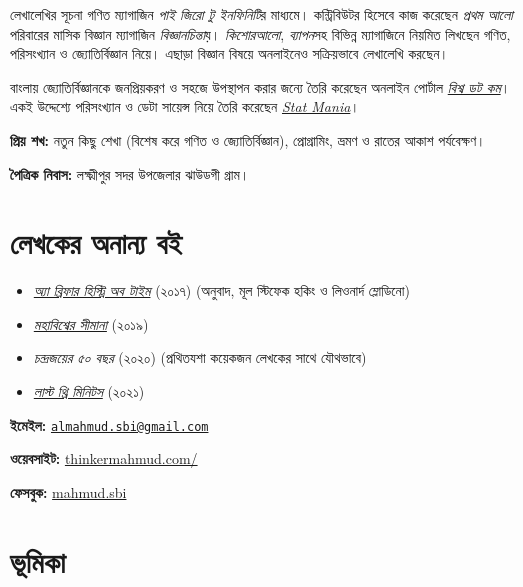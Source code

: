 \documentclass[
]{book}
\providecommand{\tightlist}{%
  \setlength{\itemsep}{0pt}\setlength{\parskip}{0pt}}
\begin{document}
লেখালেখির সূচনা গণিত ম্যাগাজিন \emph{পাই জিরো টু ইনফিনিটি}র মাধ্যমে। কন্ট্রিবিউটর হিসেবে কাজ করেছেন \emph{প্রথম আলো} পরিবারের মাসিক বিজ্ঞান ম্যাগাজিন \emph{বিজ্ঞানচিন্তা}য়। \emph{কিশোরআলো}, \emph{ব্যাপন}সহ বিভিন্ন ম্যাগাজিনে নিয়মিত লিখছেন গণিত, পরিসংখ্যান ও জ্যোতির্বিজ্ঞান নিয়ে। এছাড়া বিজ্ঞান বিষয়ে অনলাইনেও সক্রিয়ভাবে লেখালেখি করছেন।

বাংলায় জ্যোতির্বিজ্ঞানকে জনপ্রিয়করণ ও সহজে উপস্থাপন করার জন্যে তৈরি করেছেন অনলাইন পোর্টাল \href{https://sky.bishwo.com}{\emph{বিশ্ব ডট কম}}। একই উদ্দেশ্যে পরিসংখ্যান ও ডেটা সায়েন্স নিয়ে তৈরি করেছেন \href{https://www.statmania.info}{\emph{Stat Mania}}।

\textbf{প্রিয় শখ:} নতুন কিছু শেখা (বিশেষ করে গণিত ও জ্যোতির্বিজ্ঞান), প্রোগ্রামিং, ভ্রমণ ও রাতের আকাশ পর্যবেক্ষণ।

\textbf{পৈত্রিক নিবাস:} লক্ষ্মীপুর সদর উপজেলার ঝাউডগী গ্রাম।

\hypertarget{ux9b2ux996ux995ux9b0-ux985ux9a8ux9a8ux9af-ux9acux987}{%
\section{লেখকের অনান্য বই}\label{ux9b2ux996ux995ux9b0-ux985ux9a8ux9a8ux9af-ux9acux987}}

\begin{itemize}
\tightlist
\item
  \emph{\href{https://www.rokomari.com/book/author/47631}{অ্যা ব্রিফার হিস্ট্রি অব টাইম}} (২০১৭) (অনুবাদ, মূল স্টিফেক হকিং ও লিওনার্দ ম্লোডিনো)
\item
  \emph{\href{https://www.rokomari.com/book/author/47631}{মহাবিশ্বের সীমানা}} (২০১৯)
\item
  \emph{চন্দ্রজয়ের ৫০ বছর} (২০২০) (প্রথিতযশা কয়েকজন লেখকের সাথে যৌথভাবে)
\item
  \emph{\href{https://l3m.bishwo.com}{লাস্ট থ্রি মিনিটস}} (২০২১)
\end{itemize}

\textbf{ইমেইল:} \href{mailto:almahmud.sbi@gmail.com}{\nolinkurl{almahmud.sbi@gmail.com}}

\textbf{ওয়েবসাইট:} \href{https://thinkermahmud.com/}{thinkermahmud.com/}

\textbf{ফেসবুক:} \href{https://fb.com/mahmud.sbi}{mahmud.sbi}

\hypertarget{ux9adux9aeux995}{%
\section{ভূমিকা}\label{ux9adux9aeux995}}
\end{document}
